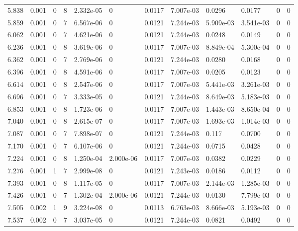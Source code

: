 \documentclass[preview]{standalone}
\begin{document}
{{{\begin{tabular}{L{1.2cm}C{1.2cm} C{0.3cm}C{0.5cm} C{1.4cm}C{1.4cm} C{1.4cm}C{1.4cm} C{1.6cm}C{1.6cm} C{1.6cm}C{1.6cm}}
  5.838  &  0.001  & 0     &  8 &  2.332e-05  & 0  &  0.0117&   7.007e-03& 0.0296 & 0.0177   &  0 & 0  \\ 
  5.859  &  0.001  & 0     &  7 &  6.567e-06  & 0  &  0.0121&   7.244e-03& 5.909e-03 & 3.541e-03   &  0 & 0  \\ 
  6.062  &  0.001  & 0     &  7 &  4.621e-06  & 0  &  0.0121&   7.244e-03& 0.0248 & 0.0149   &  0 & 0  \\ 
  6.236  &  0.001  & 0     &  8 &  3.619e-06  & 0  &  0.0117&   7.007e-03& 8.849e-04 & 5.300e-04   &  0 & 0  \\ 
  6.362  &  0.001  & 0     &  7 &  2.769e-06  & 0  &  0.0121&   7.244e-03& 0.0280 & 0.0168   &  0 & 0  \\ 
  6.396  &  0.001  & 0     &  8 &  4.591e-06  & 0  &  0.0117&   7.007e-03& 0.0205 & 0.0123   &  0 & 0  \\ 
  6.614  &  0.001  & 0     &  8 &  2.547e-06  & 0  &  0.0117&   7.007e-03& 5.441e-03 & 3.261e-03   &  0 & 0  \\ 
  6.696  &  0.001  & 0     &  7 &  3.333e-05  & 0  &  0.0121&   7.244e-03& 8.649e-03 & 5.183e-03   &  0 & 0  \\ 
  6.853  &  0.001  & 0     &  8 &  1.723e-06  & 0  &  0.0117&   7.007e-03& 1.443e-03 & 8.650e-04   &  0 & 0  \\ 
  7.040  &  0.001  & 0     &  8 &  2.615e-07  & 0  &  0.0117&   7.007e-03& 1.693e-03 & 1.014e-03   &  0 & 0  \\ 
  7.087  &  0.001  & 0     &  7 &  7.898e-07  & 0  &  0.0121&   7.244e-03& 0.117 & 0.0700   &  0 & 0  \\ 
  7.170  &  0.001  & 0     &  7 &  6.107e-06  & 0  &  0.0121&   7.244e-03& 0.0715 & 0.0428   &  0 & 0  \\ 
  7.224  &  0.001  & 0     &  8 &  1.250e-04  & 2.000e-06  &  0.0117&   7.007e-03& 0.0382 & 0.0229   &  0 & 0  \\ 
  7.276  &  0.001  & 1     &  7 &  2.999e-08  & 0  &  0.0121&   7.243e-03& 0.0186 & 0.0112   &  0 & 0  \\ 
  7.393  &  0.001  & 0     &  8 &  1.117e-05  & 0  &  0.0117&   7.007e-03& 2.144e-03 & 1.285e-03   &  0 & 0  \\ 
  7.426  &  0.001  & 0     &  7 &  1.302e-04  & 2.000e-06  &  0.0121&   7.244e-03& 0.0130 & 7.799e-03   &  0 & 0  \\ 
  7.505  &  0.002  & 1     &  9 &  3.224e-08  & 0  &  0.0113&   6.763e-03& 8.666e-03 & 5.193e-03   &  0 & 0  \\ 
  7.537  &  0.002  & 0     &  7 &  3.037e-05  & 0  &  0.0121&   7.244e-03& 0.0821 & 0.0492   &  0 & 0  \\ 

\end{tabular}}}}
\end{document}
